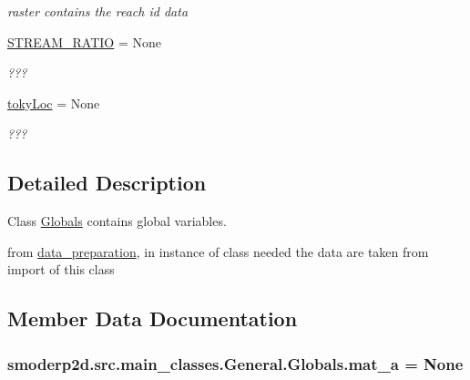 \begin{DoxyCompactItemize}
\begin{DoxyCompactList}\small\item\em raster contains the reach id data \end{DoxyCompactList}\item 
\hypertarget{classsmoderp2d_1_1src_1_1main__classes_1_1General_1_1Globals_aba766256b0b8e97ca03f048d4f23e5b2}{\hyperlink{classsmoderp2d_1_1src_1_1main__classes_1_1General_1_1Globals_aba766256b0b8e97ca03f048d4f23e5b2}{S\-T\-R\-E\-A\-M\-\_\-\-R\-A\-T\-I\-O} = None}\label{classsmoderp2d_1_1src_1_1main__classes_1_1General_1_1Globals_aba766256b0b8e97ca03f048d4f23e5b2}

\begin{DoxyCompactList}\small\item\em ??? \end{DoxyCompactList}\item 
\hypertarget{classsmoderp2d_1_1src_1_1main__classes_1_1General_1_1Globals_adc1192d1698e2859edc055965c14b783}{\hyperlink{classsmoderp2d_1_1src_1_1main__classes_1_1General_1_1Globals_adc1192d1698e2859edc055965c14b783}{toky\-Loc} = None}\label{classsmoderp2d_1_1src_1_1main__classes_1_1General_1_1Globals_adc1192d1698e2859edc055965c14b783}

\begin{DoxyCompactList}\small\item\em ??? \end{DoxyCompactList}\end{DoxyCompactItemize}


\subsection{Detailed Description}
Class \hyperlink{classsmoderp2d_1_1src_1_1main__classes_1_1General_1_1Globals}{Globals} contains global variables. 

from \hyperlink{namespacesmoderp2d_1_1src_1_1data__preparation}{data\-\_\-preparation}, in instance of class needed the data are taken from import of this class 

\subsection{Member Data Documentation}
\hypertarget{classsmoderp2d_1_1src_1_1main__classes_1_1General_1_1Globals_a68216400ee957d32802e316cf9d21d75}{
\subsubsection[{mat\-\_\-a}]{\setlength{\rightskip}{0pt plus 5cm}smoderp2d.\-src.\-main\-\_\-classes.\-General.\-Globals.\-mat\-\_\-a = None\hspace{0.3cm}{\ttfamily [static]}}}\label{classsmoderp2d_1_1src_1_1main__classes_1_1General_1_1Globals_a68216400ee957d32802e316cf9d21d75}


